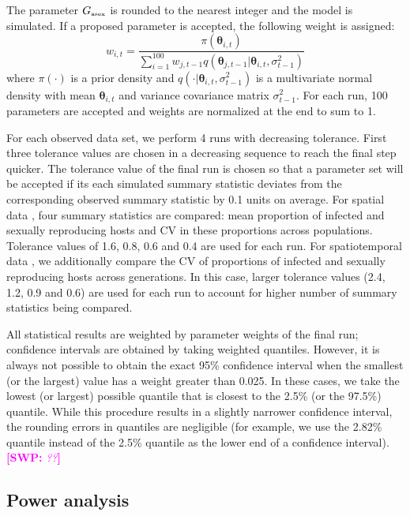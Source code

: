 \documentclass{article}\usepackage[]{graphicx}\usepackage[]{color}
\newcommand{\comment}[3]{\textcolor{#1}{\textbf{[#2: }\textit{#3}\textbf{]}}}
\newcommand{\swp}[1]{\comment{magenta}{SWP}{#1}}
\begin{document}
The parameter $G_{\textrm{\tiny asex}}$ is rounded to the nearest integer and the model is simulated.
If a proposed parameter is accepted, the following weight is assigned:
$$
w_{i,t} = \frac{\pi(\bm\theta_{i, t})}{\sum_{i=1}^{100} w_{j, t-1} q(\bm\theta_{j, t-1} | \bm\theta_{i,t}, \sigma_{t-1}^2)}
$$
where $\pi(\cdot)$ is a prior density and $q(\cdot | \bm\theta_{i,t}, \sigma_{t-1}^2)$ is a multivariate normal density with mean $\bm\theta_{i,t}$ and variance covariance matrix $\sigma_{t-1}^2$.
For each run, 100 parameters are accepted and weights are normalized at the end to sum to 1.

For each observed data set, we perform 4 runs with decreasing tolerance.
First three tolerance values are chosen in a decreasing sequence to reach the final step quicker.
The tolerance value of the final run is chosen so that a parameter set will be accepted if its each simulated summary statistic deviates from the corresponding observed summary statistic by 0.1 units on average.
For spatial data \citep{dagan2013clonal, mckone2016fine}, four summary statistics are compared: mean proportion of infected and sexually reproducing hosts and CV in these proportions across populations.
Tolerance values of 1.6, 0.8, 0.6 and 0.4 are used for each run.
For spatiotemporal data \citep{vergara2014infection}, we additionally compare the CV of proportions of infected and sexually reproducing hosts across generations.
In this case, larger tolerance values (2.4, 1.2, 0.9 and 0.6) are used for each run to account for higher number of summary statistics being compared.

All statistical results are weighted by parameter weights of the final run; 
confidence intervals are obtained by taking weighted quantiles. 
However, it is always not possible to obtain the exact 95\% confidence interval when the smallest (or the largest) value has a weight greater than 0.025. 
In these cases, we take the lowest (or largest) possible quantile that is closest to the 2.5\% (or the 97.5\%) quantile.
While this procedure results in a slightly narrower confidence interval, the rounding errors in quantiles are negligible (for example, we use the 2.82\% quantile instead of the 2.5\% quantile as the lower end of a confidence interval).\swp{??}

\subsection{Power analysis}
\end{document}
